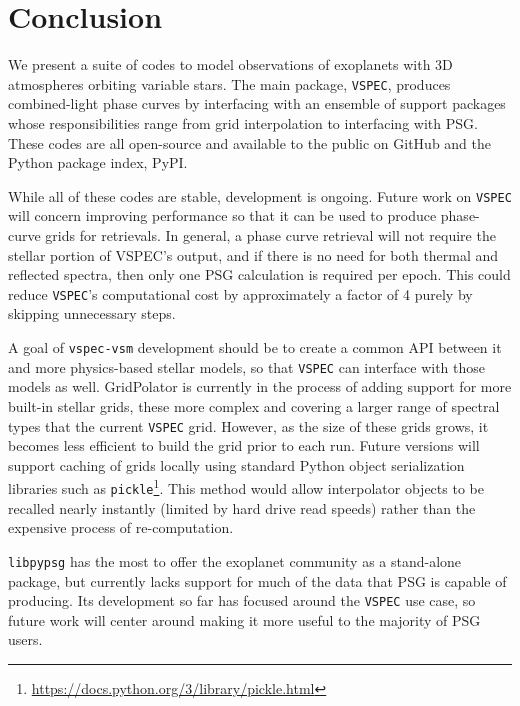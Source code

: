 \documentclass[twocolumn,linenumbers]{aastex631}
\newcommand{\vspec}[1]{\texttt{VSPEC}#1}
\begin{document}

\section{Conclusion}
\label{sec:conclusion}
We present a suite of codes to model observations of exoplanets with 3D atmospheres orbiting variable stars. The main package, \vspec{}, produces combined-light phase curves by interfacing with an ensemble of support packages whose responsibilities range from grid interpolation to interfacing with PSG. These codes are all open-source and available to the public on GitHub and the Python package index, PyPI.

While all of these codes are stable, development is ongoing. Future work on \vspec{} will concern improving performance so that it can be used to produce phase-curve grids for retrievals. In general, a phase curve retrieval will not require the stellar portion of VSPEC's output, and if there is no need for both thermal and reflected spectra, then only one PSG calculation is required per epoch. This could reduce \vspec{}'s computational cost by approximately a factor of 4 purely by skipping unnecessary steps.

A goal of \texttt{vspec-vsm} development should be to create a common API between it and more physics-based stellar models, so that \vspec{} can interface with those models as well. GridPolator is currently in the process of adding support for more built-in stellar grids, these more complex and covering a larger range of spectral types that the current \vspec{} grid. However, as the size of these grids grows, it becomes less efficient to build the grid prior to each run. Future versions will support caching of grids locally using standard Python object serialization libraries such as \texttt{pickle}\footnote{\url{https://docs.python.org/3/library/pickle.html}}. This method would allow interpolator objects to be recalled nearly instantly (limited by hard drive read speeds) rather than the expensive process of re-computation.

\texttt{libpypsg} has the most to offer the exoplanet community as a stand-alone package, but currently lacks support for much of the data that PSG is capable of producing. Its development so far has focused around the \vspec{} use case, so future work will center around making it more useful to the majority of PSG users.
\end{document}
